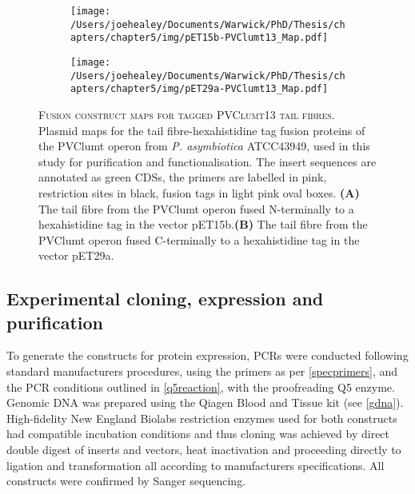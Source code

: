 \begin{figure}[p]
\centering
    \begin{subfigure}{\textwidth}
        \centering
        \texttt{[image: /Users/joehealey/Documents/Warwick/PhD/Thesis/chapters/chapter5/img/pET15b-PVClumt13\_Map.pdf]}
        \captionsetup{singlelinecheck=off, justification=centering, font=footnotesize, aboveskip=10pt}
        \caption{}
        \label{pET15lumt}
    \end{subfigure}%
    
    \vspace{0.5cm}
    
    \begin{subfigure}{\textwidth}
        \centering
            \texttt{[image: /Users/joehealey/Documents/Warwick/PhD/Thesis/chapters/chapter5/img/pET29a-PVClumt13\_Map.pdf]}
            \captionsetup{singlelinecheck=off, justification=centering, font=footnotesize, aboveskip=10pt}
            \caption{}
            \label{pET29lumt}
        \end{subfigure}%
	\captionsetup{singlelinecheck=off, justification=justified, font=footnotesize, aboveskip=10pt}
	\caption[Plasmid maps for cloned PVClumt tail fibre proteins]{\textsc{\normalsize Fusion construct maps for tagged PVClumt13 tail fibres.}\vspace{0.1cm} \newline Plasmid maps for the tail fibre-hexahistidine tag fusion proteins of the PVClumt operon from \emph{P. asymbiotica} ATCC43949, used in this study for purification and functionalisation. The insert sequences are annotated as green CDSs, the primers are labelled in pink, restriction sites in black, fusion tags in light pink oval boxes. \textbf{(A)} The tail fibre from the PVClumt operon fused N-terminally to a hexahistidine tag in the vector pET15b.\textbf{(B)} The tail fibre from the PVClumt operon fused C-terminally to a hexahistidine tag in the vector pET29a.}
	\label{tailfibreplasmidslumt}
\end{figure}
\clearpage




\subsection{Experimental cloning, expression and purification}
To generate the constructs for protein expression, PCRs were conducted following standard manufacturers procedures, using the primers as per \vref{specprimers}, and the PCR conditions outlined in \vref{q5reaction}, with the proofreading Q5 enzyme. Genomic DNA was prepared using the Qiagen Blood and Tissue kit (see \vref{gdna}). High-fidelity New England Biolabs restriction enzymes used for both constructs had compatible incubation conditions and thus cloning was achieved by direct double digest of inserts and vectors, heat inactivation and proceeding directly to ligation and transformation all according to manufacturers specifications. All constructs were confirmed by Sanger sequencing.

